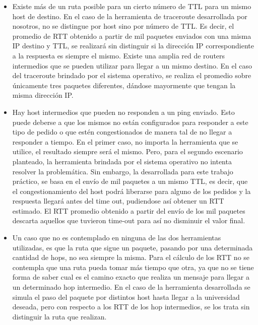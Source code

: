 \begin{itemize}
\item Existe más de un ruta posible para un cierto número de TTL para un mismo host de destino. En el caso de la herramienta de traceroute desarrollada por nosotros, no se distingue por host sino por número de TTL. Es decir, el promedio de RTT obtenido a partir de mil paquetes enviados con una misma IP destino y TTL, se realizará sin distinguir si la dirección IP correspondiente a la respuesta es siempre el mismo. Existe una amplia red de routers intermedios que se pueden utilizar para llegar a un mismo destino. En el caso del traceroute brindado por el sistema operativo, se realiza el promedio sobre únicamente tres paquetes diferentes, dándose mayormente que tengan la misma dirección IP. 

\item Hay host intermedios que pueden no responden a un ping enviado. Esto puede deberse a que los mismos no están configurados para 
responder a este tipo de pedido o que estén congestionados de manera tal de no llegar a responder a tiempo. En el primer caso, 
no importa la herramienta que se utilice, el resultado siempre será el mismo. Pero, para el segundo escenario 
planteado, la herramienta brindada por el sistema operativo no intenta resolver la problemática. Sin embargo, la 
desarrollada para este trabajo práctico, se basa en el envío de mil paquetes a un mismo TTL, es decir, que el 
congestionamiento del host podrá liberarse para alguno de los pedidos y la respuesta llegará antes 
del time out, pudiendose así obtener un RTT estimado. El RTT promedio obtenido a partir del envío de los mil paquetes descarta aquellos 
que tuvieron time-out para así no disminuir el valor final.

\item Un caso que no es contemplado en ninguna de las dos herramientas utilizadas, es que la ruta que sigue un paquete, pasando por una determinada cantidad de hops, no sea siempre la misma. Para el cálculo de los RTT no se contempla que una ruta pueda tomar más tiempo que otra, ya que no se tiene forma de saber cual es el camino exacto que realiza un mensaje para llegar a un determinado hop intermedio. En el caso de la herramienta desarrollada se simula el paso del paquete por distintos host hasta llegar a la universidad deseada, pero con respecto a los RTT de los hop intermedios, se los trata sin distinguir la ruta que realizan. 
\end{itemize}



